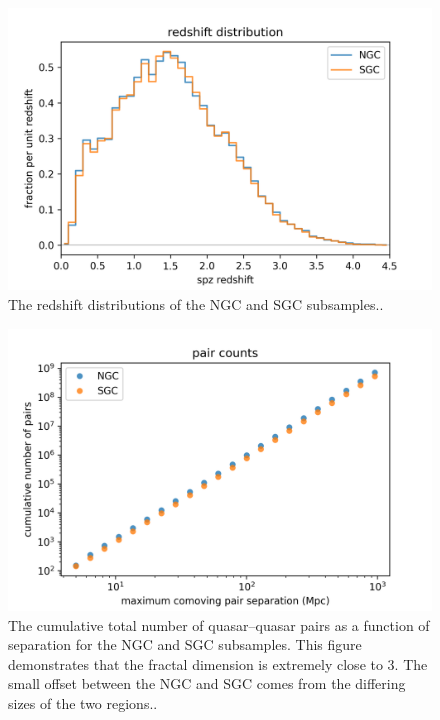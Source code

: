 \documentclass[modern]{aastex631}
\newlength{\figurewidth}
\begin{document}
\begin{figure}[t!]
  \begin{mdframed}
  \color{captiongray}
  \begin{center}
    \includegraphics[width=\figurewidth]{notebooks/zhist.png}
  \end{center}
    \caption{The redshift distributions of the NGC and SGC subsamples.\label{fig:zhist}.}
  \end{mdframed}
\end{figure}

\begin{figure}[t!]
  \begin{mdframed}
  \color{captiongray}
  \begin{center}
    \includegraphics[width=\figurewidth]{notebooks/cumulativeDD.png}
  \end{center}
    \caption{The cumulative total number of quasar--quasar pairs as a function of separation for the NGC and SGC subsamples.
    This figure demonstrates that the fractal dimension is extremely close to 3. The small offset between the NGC and SGC comes from the differing sizes of the two regions.\label{fig:cumulative}.}
  \end{mdframed}
\end{figure}
\end{document}
